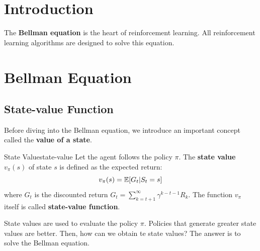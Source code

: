 \section{Introduction}
The \textbf{Bellman equation} is the heart of reinforcement learning.
All reinforcement learning algorithms are designed to solve this equation.
\section{Bellman Equation}
    \subsection{State-value Function}
        Before diving into the Bellman equation, we introduce an important concept called the \textbf{value of a state}.
        \begin{defn}{State Value}{state-value}
            Let the agent follows the policy $\pi$. The \textbf{state value} $v_\pi(s)$ of state $s$ is defined as the expected return:
            \begin{equation}
                v_\pi(s) = \mathbb{E}[G_t|S_t=s] \label{eq:state-value}
            \end{equation}
            where $G_t$ is the discounted return $G_t=\sum_{k=t+1}^{\infty}\gamma^{k-t-1}R_{k}$.
            The function $v_\pi$ itself is called \textbf{state-value function}.
        \end{defn}
        State values are used to evaluate the policy $\pi$. Policies that generate greater state values are better. Then, how can we
        obtain te state values? The answer is to solve the Bellman equation.
